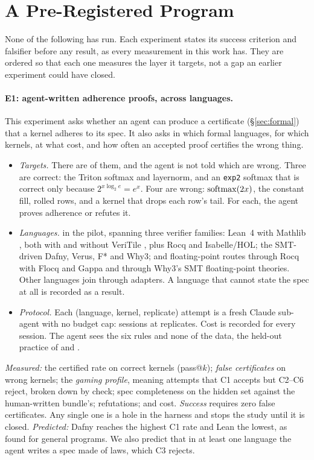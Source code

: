 \section{A Pre-Registered Program}
\label{sec:program}

None of the following has run. Each experiment states its success criterion and
falsifier before any result, as every measurement in this work has. They are ordered
so that each one measures the layer it targets, not a gap an earlier experiment could
have closed.

\paragraph{E1: agent-written adherence proofs, across languages.}
This experiment asks whether an agent can produce a certificate (\S\ref{sec:formal})
that a kernel adheres to its spec. It also asks in which formal languages, for which
kernels, at what cost, and how often an accepted proof certifies the wrong thing.
\begin{itemize}
  \item \emph{Targets.} There are \pilotTargets{} of them, and the agent is not told which are wrong.
    Three are correct: the Triton softmax and layernorm, and an \texttt{exp2} softmax that is
    correct only because $2^{x\log_2 e} = e^x$. Four are wrong: $\operatorname{softmax}(2x)$, the
    constant fill, rolled rows, and a kernel that drops each row's tail. For each, the
    agent proves adherence or refutes it.
  \item \emph{Languages.} \pilotLanguages{} in the pilot, spanning three verifier families:
    Lean~4 with Mathlib \citep{demoura2021lean4,mathlib2020}, both with and without VeriTile
    \citep{veritile2026}, plus Rocq and Isabelle/HOL; the SMT-driven Dafny, Verus, F* and
    Why3; and floating-point routes through Rocq with Flocq and Gappa and through Why3's
    SMT floating-point theories. Other languages join through adapters. A language that
    cannot state the spec at all is recorded as a result.
  \item \emph{Protocol.} Each (language, kernel, replicate) attempt is a fresh Claude
    sub-agent with no budget cap: \pilotSessions{} sessions at \pilotReplicates{}
    replicates. Cost is recorded for every session. The agent sees the six rules and none
    of the data, the held-out practice of \citet{ye2025verina} and \citet{thakur2025clever}.
\end{itemize}
\emph{Measured:} the certified rate on correct kernels (pass@$k$); \emph{false
certificates} on wrong kernels; the \emph{gaming profile}, meaning attempts that C1 accepts
but C2--C6 reject, broken down by check; spec completeness on the hidden set against the
human-written bundle's; refutations; and cost. \emph{Success} requires zero false
certificates. Any single one is a hole in the harness and stops the study until it is
closed. \emph{Predicted:} Dafny reaches the highest C1 rate and Lean the lowest, as
\citet{bursuc2025vericoding} found for general programs. We also predict that in at least
one language the agent writes a spec made of laws, which C3 rejects.

